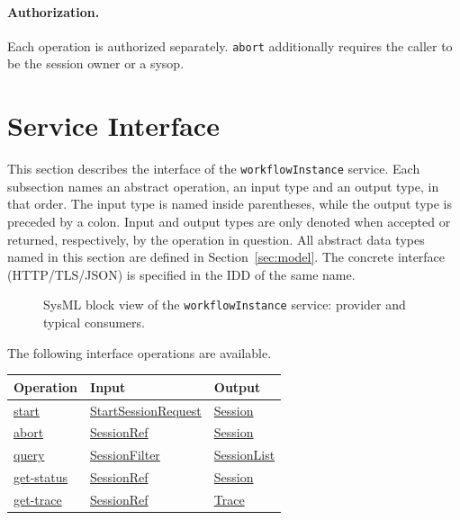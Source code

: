 \documentclass[a4paper]{arrowhead}
\newcommand{\mref}[1]{{\textcolor{ArrowheadPurple}{\hyperref[sec:model:#1]{#1}}}}
\newcommand{\oref}[1]{{\textcolor{ArrowheadBlue}{\hyperref[sec:operations:#1]{#1}}}}
\begin{document}
\paragraph{Authorization.} Each operation is authorized separately. \texttt{abort} additionally requires the caller to be the session owner or a sysop.

\newpage
\section{Service Interface}
\label{sec:operations}
This section describes the interface of the \texttt{workflowInstance} service. Each subsection names an abstract operation,
an input type and an output type, in that order. The input type is named inside parentheses, while the output type is
preceded by a colon. Input and output types are only denoted when accepted or returned, respectively, by the operation
in question. All abstract data types named in this section are defined in Section~\ref{sec:model}. The concrete
interface (HTTP/TLS/JSON) is specified in the IDD of the same name.

\begin{figure}[ht!]
  \centering
  \caption{SysML block view of the \texttt{workflowInstance} service: provider and typical consumers.}
  \label{fig:SD}
\end{figure}

The following interface operations are available.

{\small
\begin{longtable}{|p{4.4cm}|p{5.6cm}|p{5.8cm}|}

\hline
\rowcolor{gray!33} Operation & Input & Output \\ \hline
\endhead
\oref{start} & \mref{StartSessionRequest} & \mref{Session} \\ \hline
\oref{abort} & \mref{SessionRef} & \mref{Session} \\ \hline
\oref{query} & \mref{SessionFilter} & \mref{SessionList} \\ \hline
\oref{get-status} & \mref{SessionRef} & \mref{Session} \\ \hline
\oref{get-trace} & \mref{SessionRef} & \mref{Trace} \\ \hline
\end{longtable}
}
\end{document}
